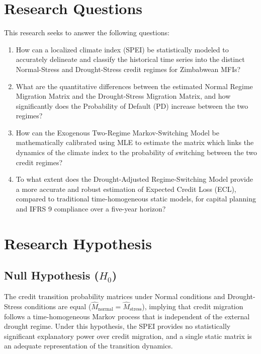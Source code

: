 \documentclass[12pt,a4paper]{article}
\begin{document}
\section{Research Questions}

This research seeks to answer the following questions:

\begin{enumerate}[noitemsep]
    \item How can a localized climate index (SPEI) be statistically modeled to accurately delineate and classify the historical time series into the distinct Normal-Stress and Drought-Stress credit regimes for Zimbabwean MFIs?
    
    \item What are the quantitative differences between the estimated Normal Regime Migration Matrix and the Drought-Stress Migration Matrix, and how significantly does the Probability of Default (PD) increase between the two regimes?
    
    \item How can the Exogenous Two-Regime Markov-Switching Model be mathematically calibrated using MLE to estimate the matrix which links the dynamics of the climate index to the probability of switching between the two credit regimes?
    
    \item To what extent does the Drought-Adjusted Regime-Switching Model provide a more accurate and robust estimation of Expected Credit Loss (ECL), compared to traditional time-homogeneous static models, for capital planning and IFRS 9 compliance over a five-year horizon?
\end{enumerate}

\section{Research Hypothesis}

\subsection{Null Hypothesis ($H_0$)}

The credit transition probability matrices under Normal conditions and Drought-Stress conditions are equal ($\hat{M}_{\text{normal}} = \hat{M}_{\text{stress}}$), implying that credit migration follows a time-homogeneous Markov process that is independent of the external drought regime. Under this hypothesis, the SPEI provides no statistically significant explanatory power over credit migration, and a single static matrix is an adequate representation of the transition dynamics.
\end{document}
